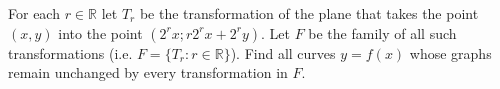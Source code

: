 For each $r\in\mathbb{R}$ let $T_r$ be the transformation of the plane that takes the point $(x, y)$ into the point $(2^r x; r2^r x+2^r y)$. Let $F$ be the family of all such transformations (i.e. $F = \{T_r : r\in\mathbb{R}\}$). Find all curves $y = f(x)$ whose graphs remain unchanged by every transformation in $F$.